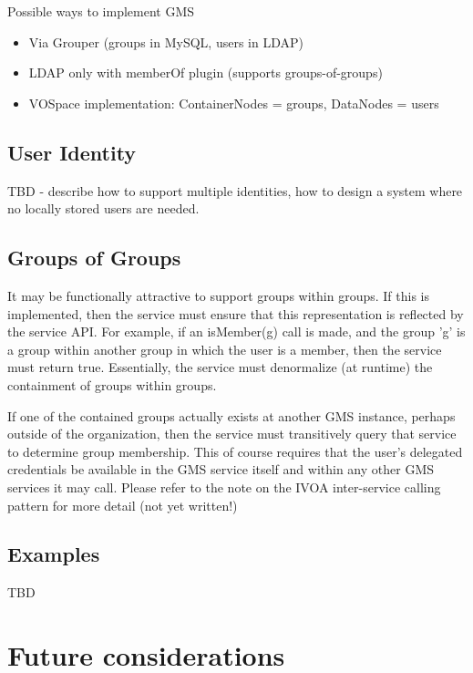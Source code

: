 \documentclass[11pt,a4paper]{ivoa}
\begin{document}
Possible ways to implement GMS

\begin{itemize}
\item Via Grouper (groups in MySQL, users in LDAP)
\item LDAP only with memberOf plugin (supports groups-of-groups)
\item VOSpace implementation: ContainerNodes = groups, DataNodes = users
\end{itemize}

\subsection{User Identity}
\label{subsection:useridentity}

TBD - describe how to support multiple identities, how to design a system where no locally stored users are needed.

\subsection{Groups of Groups}

It may be functionally attractive to support groups within groups.  If this is implemented, then the service must ensure that this representation is reflected by the service API.  For example, if an isMember(g) call is made, and the group 'g' is a group within another group in which the user is a member, then the service must return true.  Essentially, the service must denormalize (at runtime) the containment of groups within groups.

If one of the contained groups actually exists at another GMS instance, perhaps outside of the organization, then the service must transitively query that service to determine group membership.  This of course requires that the user's delegated credentials be available in the GMS service itself and within any other GMS services it may call.  Please refer to the note on the IVOA inter-service calling pattern for more detail \citep{note:IVOSvcPatterns} (not yet written!)


\subsection {Examples}

TBD

\section {Future considerations}
\end{document}
